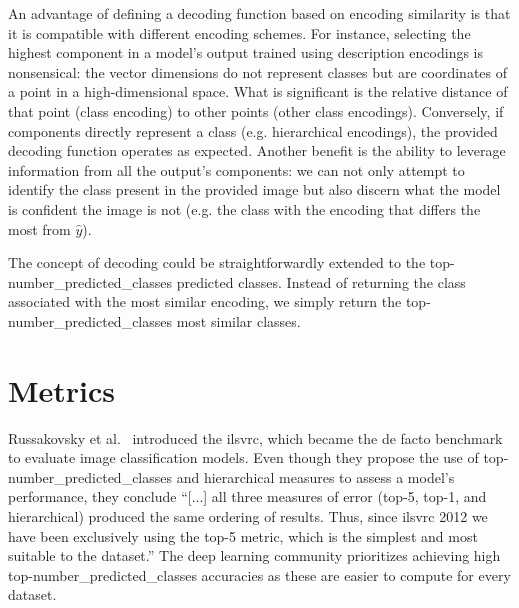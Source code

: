 An advantage of defining a decoding function based on encoding similarity is that it is compatible with different encoding schemes. For instance, selecting the highest component in a model's output trained using description encodings is nonsensical: the vector dimensions do not represent classes but are coordinates of a point in a high-dimensional space. What is significant is the relative distance of that point (class encoding) to other points (other class encodings).
Conversely, if components directly represent a class (e.g. hierarchical encodings), the provided decoding function operates as expected.
Another benefit is the ability to leverage information from all the output's components: we can not only attempt to identify the class present in the provided image but also discern what the model is confident the image is not (e.g. the class with the encoding that differs the most from $\hat{y}$).\medskip

The concept of decoding could be straightforwardly extended to the top-\gls{number_predicted_classes} predicted classes. Instead of returning the class associated with the most similar encoding, we simply return the top-\gls{number_predicted_classes} most similar classes.

\section{Metrics}
\label{sec:metrics}
Russakovsky et al.~\cite{ImagenetLargeRussak2014} introduced the \acrfull{ilsvrc}, which became the de facto benchmark to evaluate image classification models.
Even though they propose the use of top-\gls{number_predicted_classes} and hierarchical measures to assess a model's performance, they conclude ``[...] all three measures of error (top-5, top-1, and hierarchical) produced the same ordering of results. Thus, since \acrshort{ilsvrc} 2012 we have been exclusively using the top-5 metric, which is the simplest and most suitable to the dataset.''
The deep learning community prioritizes achieving high top-\gls{number_predicted_classes} accuracies as these are easier to compute for every dataset.

